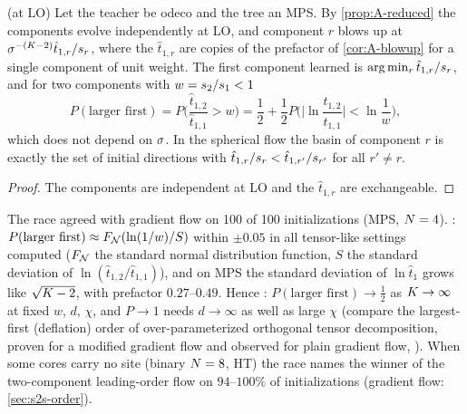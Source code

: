 \begin{proposition}\label{prop:A-race}
  \proven{} (at LO) 
  Let the teacher be odeco and the tree an MPS. By \cref{prop:A-reduced} the components evolve
  independently at LO, and component $r$ blows up at $\sigma^{-(K-2)}\hat t_{1,r}/s_{r}$, where the
  $\hat t_{1,r}$ are \iid copies of the prefactor of \cref{cor:A-blowup} for a single component of unit
  weight. The first component learned is $\arg\min_r\hat t_{1,r}/s_{r}$, and for two components with
  $w=s_{2}/s_{1}<1$
  \begin{equation}\label{eq:A-race}
    P(\text{larger first})=P\Big(\frac{\hat t_{1,2}}{\hat t_{1,1}}>w\Big)
    =\frac12+\frac12P\Big(\Big|\ln\frac{\hat t_{1,2}}{\hat t_{1,1}}\Big|<\ln\frac1w\Big),
  \end{equation}
  which does not depend on $\sigma$. In the spherical flow the basin of component $r$ is exactly the set of
  initial directions with $\hat t_{1,r}/s_{r}<\hat t_{1,r'}/s_{r'}$ for all $r'\ne r$.
\end{proposition}
\begin{proof}
  The components are independent at LO and the $\hat t_{1,r}$ are exchangeable.
\end{proof}
The race agreed with gradient flow on 100 of 100 initializations (MPS, $N=4$). \empirical:
$P(\text{larger first})\approx F_{\mathcal{N}}(\ln(1/w)/S)$ within $\pm0.05$ in all tensor-like settings computed ($F_{\mathcal{N}}$ the
standard normal distribution function, $S$ the standard deviation of $\ln(\hat t_{1,2}/\hat t_{1,1})$), and on MPS
the standard deviation of $\ln\hat t_1$ grows like $\sqrt{K-2}$, with prefactor $0.27$--$0.49$. Hence \conjecture:
$P(\text{larger first})\to\frac12$ as
$K\to\infty$ at fixed $w$, $d$, $\chi$, and $P\to1$ needs $d\to\infty$ as well as large $\chi$ (compare the
largest-first (deflation) order of over-parameterized orthogonal tensor decomposition, proven for a modified
gradient flow and observed for plain gradient flow, \citealp{ge2021understanding}). When some cores carry no
site (binary $N=8$, HT) the race names the winner of the two-component leading-order flow on $94$--$100\%$ of
initializations \empirical{} (gradient flow: \cref{sec:s2s-order}).

